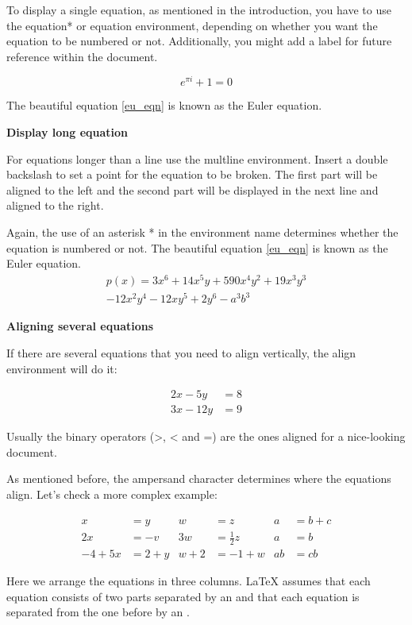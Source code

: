 \documentclass[12pt, letterpaper]{article}
\begin{document}
To display a single equation, as mentioned in the introduction, you have to use the equation* or equation environment, depending on whether you want the equation to be numbered or not. Additionally, you might add a label for future reference within the document.

\begin{equation} \label{eu_eqn}
e^{\pi i}+1=0    
\end{equation} 

The beautiful equation \ref{eu_eqn} is known as the Euler equation.

\bigskip
\textbf{Display long equation}

For equations longer than a line use the multline environment. Insert a double backslash to set a point for the equation to be broken. The first part will be aligned to the left and the second part will be displayed in the next line and aligned to the right.

Again, the use of an asterisk * in the environment name determines whether the equation is numbered or not.
The beautiful equation \ref{eu_eqn} is known as the Euler equation.
\begin{multline*}
p(x) = 3x^6 + 14x^5y + 590x^4y^2 + 19x^3y^3\\ 
- 12x^2y^4 - 12xy^5 + 2y^6 - a^3b^3
\end{multline*}

\textbf{Aligning several equations}

If there are several equations that you need to align vertically, the align environment will do it:

\begin{align}
    2x-5y&=8\\ 
    3x-12y&=9
\end{align}

Usually the binary operators (>, < and =) are the ones aligned for a nice-looking document.

As mentioned before, the ampersand character  determines where the equations align. Let's check a more complex example:

\begin{align*}
    x&=y          & w&=z                  & a&=b+c\\ 
    2x&=-v        & 3w&=\frac{1}{2}z      & a&=b\\
    -4 + 5x&=2+y  & w+2&=-1+w             & ab&=cb
\end{align*}


Here we arrange the equations in three columns. LaTeX assumes that each equation consists of two parts separated by an  and that each equation is separated from the one before by an .
\end{document}
